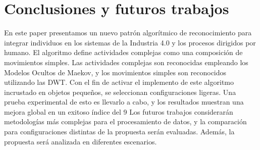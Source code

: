 \documentclass{article}
\begin{document}
\section {Conclusiones y futuros trabajos}
En este paper presentamos un nuevo patrón algorítmico de reconocimiento para integrar individuos en los sistemas de la Industria 4.0 y los procesos dirigidos por humano. El algoritmo define actividades complejas como una composición de movimientos simples. Las actividades complejas son reconocidas empleando los Modelos Ocultos de Maekov, y los movimientos simples son reconocidos utilizando las DWT. Con el fin de activar el implemento de este algoritmo incrustado en objetos pequeños, se seleccionan configuraciones ligeras. Una prueba experimental de esto es llevarlo a cabo, y los resultados muestran una mejora global en un exitoso índice del 9%
Los futuros trabajos considerarán metodologías más complejas para el procesamiento de datos, y la comparación para configuraciones distintas de la propuesta serán evaluadas.
Además, la propuesta será analizada en diferentes escenarios.
\end{document}
